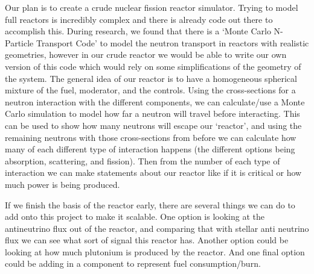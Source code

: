 \documentclass{notes}
\begin{document}
\tab Our plan is to create a crude nuclear fission reactor simulator. Trying to model full reactors is incredibly complex and there is already code out there to accomplish this. During research, we found that there is a `Monte Carlo N-Particle Transport Code' to model the neutron transport in reactors with realistic geometries, however in our crude reactor we would be able to write our own version of this code which would rely on some simplifications of the geometry of the system. The general idea of our reactor is to have a homogeneous spherical mixture of the fuel, moderator, and the controls. Using the cross-sections for a neutron interaction with the different components, we can calculate/use a Monte Carlo simulation to model how far a neutron will travel before interacting. This can be used to show how many neutrons will escape our `reactor', and using the remaining neutrons with those cross-sections from before we can calculate how many of each different type of interaction happens (the different options being absorption, scattering, and fission). Then from the number of each type of interaction we can make statements about our reactor like if it is critical or how much power is being produced.

\tab If we finish the basis of the reactor early, there are several things we can do to add onto this project to make it scalable. One option is looking at the antineutrino flux out of the reactor, and comparing that with stellar anti neutrino flux we can see what sort of signal this reactor has. Another option could be looking at how much plutonium is produced by the reactor. And one final option could be adding in a component to represent fuel consumption/burn.
\end{document}
